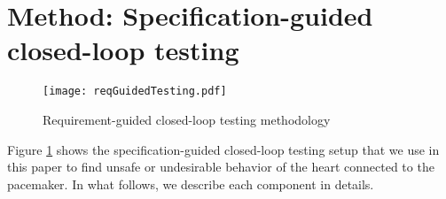 \section{Method: Specification-guided closed-loop testing}
\label{method}

\begin{figure}[!t]
	\centering
	\texttt{[image: reqGuidedTesting.pdf]}
	\caption{\small Requirement-guided closed-loop testing methodology}
	\label{fig:reqGuidedTesting}
\end{figure} 

Figure \ref{fig:reqGuidedTesting} shows the specification-guided closed-loop testing setup that we use in this paper to find unsafe or undesirable behavior of the heart connected to the pacemaker.
In what follows, we describe each component in details.





